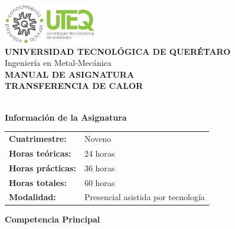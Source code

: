 \documentclass[12pt,a4paper]{book}
\begin{document}
	
	\begin{titlepage}
		\begin{center}
			
			\includegraphics[width=4cm]{../../Imagenes/Logo_uteq}\\[1cm]
			
			{\large \textcolor{uteqblue}{\textbf{UNIVERSIDAD TECNOLÓGICA DE QUERÉTARO}}}\\[0.3cm]
			
			{\normalsize \textcolor{uteqgray}{Ingeniería en Metal-Mecánica}}\\[1cm]
			
			{\Huge \textcolor{uteqblue}{\textbf{MANUAL DE ASIGNATURA}}}\\[1cm]
			
			{\LARGE \textcolor{uteqgray}{\textbf{TRANSFERENCIA DE CALOR}}}\\[0.5cm]
			{\large \textcolor{uteqgray}{}}\\[3cm]
			
			\begin{tcolorbox}[colback=uteqblue!10!white,colframe=uteqblue,width=14cm]
				\begin{center}
					\textbf{Información de la Asignatura}\\[0.5cm]
					\begin{tabular}{ll}
						\textbf{Cuatrimestre:} & Noveno \\
						\textbf{Horas teóricas:} & 24 horas \\
						\textbf{Horas prácticas:} & 36 horas \\
						\textbf{Horas totales:} & 60 horas \\
						\textbf{Modalidad:} & Presencial asistida por tecnología \\
						
					\end{tabular}
				\end{center}
			\end{tcolorbox}
			
			\vspace{1cm}
			
			\begin{tcolorbox}[colback=uteqgreen!10!white,colframe=uteqgreen,width=14cm]
				\begin{center}
					\textbf{Competencia Principal}\\[0.3cm]
					\small{}
				\end{center}
			\end{tcolorbox}
			

\end{center}
\end{titlepage}
\end{document}

